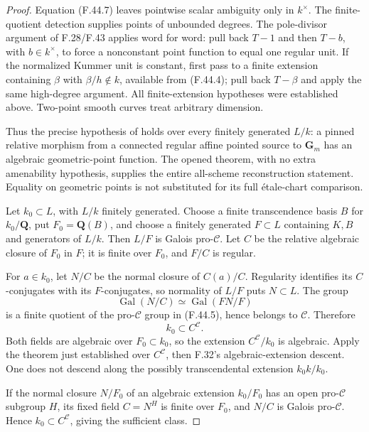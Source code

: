 \begin{proof}
Equation \textup{(F.44.7)} leaves pointwise scalar ambiguity only in \(k^\times\). The finite-quotient detection supplies points of unbounded degrees. The pole-divisor argument of F.28/F.43 applies word for word: pull back \(T-1\) and then \(T-b\), with \(b\in k^\times\), to force a nonconstant point function to equal one regular unit. If the normalized Kummer unit is constant, first pass to a finite extension containing \(\beta\) with \(\beta/h\notin k\), available from \textup{(F.44.4)}; pull back \(T-\beta\) and apply the same high-degree argument. All finite-extension hypotheses were established above. Two-point smooth curves treat arbitrary dimension.

Thus the precise hypothesis of \citet[Theorem~4.18(5)]{F_CHW2024} holds over every finitely generated \(L/k\): a pinned relative morphism from a connected regular affine pointed source to \(\mathbf G_m\) has an algebraic geometric-point function. The opened theorem, with no extra amenability hypothesis, supplies the entire all-scheme reconstruction statement. Equality on geometric points is not substituted for its full étale-chart comparison.


Let \(k_0\subset L\), with \(L/k\) finitely generated. Choose a finite transcendence basis \(B\) for \(k_0/\mathbf Q\), put \(F_0=\mathbf Q(B)\), and choose a finitely generated \(F\subset L\) containing \(K,B\) and generators of \(L/k\). Then \(L/F\) is Galois pro-\(\mathcal C\). Let \(C\) be the relative algebraic closure of \(F_0\) in \(F\); it is finite over \(F_0\), and \(F/C\) is regular.

For \(a\in k_0\), let \(N/C\) be the normal closure of \(C(a)/C\). Regularity identifies its \(C\)-conjugates with its \(F\)-conjugates, so normality of \(L/F\) puts \(N\subset L\). The group
\[
 \operatorname{Gal}(N/C)\simeq\operatorname{Gal}(FN/F)
\]
is a finite quotient of the pro-\(\mathcal C\) group in \textup{(F.44.5)}, hence belongs to \(\mathcal C\). Therefore
\[
                       k_0\subset C^{\mathcal C}.
 \tag{F.44.15}
\]
Both fields are algebraic over \(F_0\subset k_0\), so the extension \(C^{\mathcal C}/k_0\) is algebraic. Apply the theorem just established over \(C^{\mathcal C}\), then F.32's algebraic-extension descent. One does not descend along the possibly transcendental extension \(k_0k/k_0\).

If the normal closure \(N/F_0\) of an algebraic extension \(k_0/F_0\) has an open pro-\(\mathcal C\) subgroup \(H\), its fixed field \(C=N^H\) is finite over \(F_0\), and \(N/C\) is Galois pro-\(\mathcal C\). Hence \(k_0\subset C^{\mathcal C}\), giving the sufficient class.


\end{proof}
